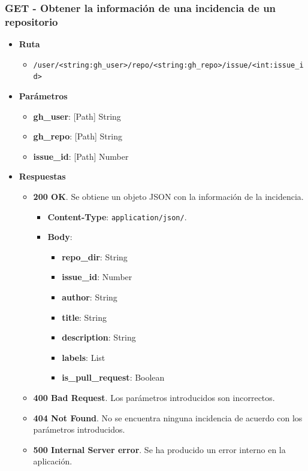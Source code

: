 \subsubsection{GET - Obtener la información de una incidencia de un repositorio}

\begin{itemize}
    \item[] \textbf{Ruta}
        \begin{itemize} \setlength\itemsep{0.2em}
            \item[] \texttt{/user/<string:gh\_user>/repo/<string:gh\_repo>/issue/<int:issue\_id>}
        \end{itemize}
    \item[] \textbf{Parámetros}
        \begin{itemize} \setlength\itemsep{0.2em}
            \item[] \textbf{gh\_user}: [Path] String
            \item[] \textbf{gh\_repo}: [Path] String
            \item[] \textbf{issue\_id}: [Path] Number            
        \end{itemize}
    \item[] \textbf{Respuestas}
        \begin{itemize} \setlength\itemsep{0.2em}
            \item[] \textbf{200 OK}. Se obtiene un objeto JSON con la información de la incidencia.
                \begin{itemize} \setlength\itemsep{0.2em}
                    \item[] \textbf{Content-Type}: \texttt{application/json/}.
                    \item[] \textbf{Body}: 
                        \begin{itemize} \setlength\itemsep{0.2em}
                            \item[] \textbf{repo\_dir}: String
                            \item[] \textbf{issue\_id}: Number
                            \item[] \textbf{author}: String
                            \item[] \textbf{title}: String
                            \item[] \textbf{description}: String
                            \item[] \textbf{labels}: List
                            \item[] \textbf{is\_pull\_request}: Boolean
                        \end{itemize}
                \end{itemize}
            \item[] \textbf{400 Bad Request}. Los parámetros introducidos son incorrectos.
            \item[] \textbf{404 Not Found}. No se encuentra ninguna incidencia de acuerdo con los parámetros introducidos.
            \item[] \textbf{500 Internal Server error}. Se ha producido un error interno en la aplicación.
        \end{itemize}
\end{itemize}

